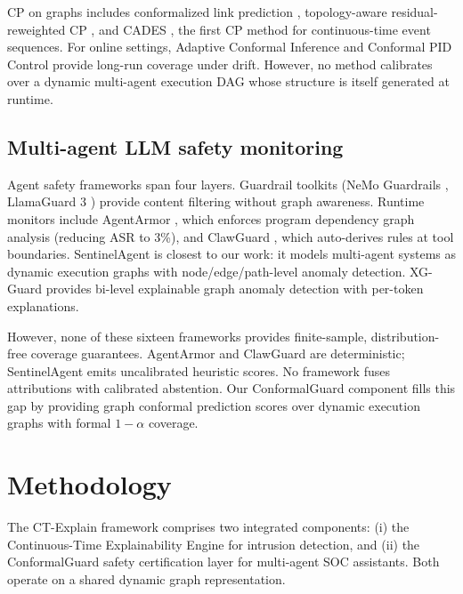 \documentclass[preprint,review,12pt]{elsarticle}
\begin{document}
CP on graphs includes conformalized link prediction \cite{conformalized_link_2024}, topology-aware residual-reweighted CP \cite{residual_reweighted_cp_2025}, and CADES \cite{cades_2025}, the first CP method for continuous-time event sequences. For online settings, Adaptive Conformal Inference \cite{gibbs_aci_2024} and Conformal PID Control \cite{angelopoulos_pid_2024} provide long-run coverage under drift. However, no method calibrates over a dynamic multi-agent execution DAG whose structure is itself generated at runtime.

\subsection{Multi-agent LLM safety monitoring}

Agent safety frameworks span four layers. Guardrail toolkits (NeMo Guardrails \cite{nemo_guardrails_2023}, LlamaGuard 3 \cite{llamaguard3_2024}) provide content filtering without graph awareness. Runtime monitors include AgentArmor \cite{agentarmor_2025}, which enforces program dependency graph analysis (reducing ASR to 3\%), and ClawGuard \cite{clawguard_2025}, which auto-derives rules at tool boundaries. SentinelAgent \cite{sentinelagent_2025} is closest to our work: it models multi-agent systems as dynamic execution graphs with node/edge/path-level anomaly detection. XG-Guard \cite{xgguard_2025} provides bi-level explainable graph anomaly detection with per-token explanations.

However, none of these sixteen frameworks provides finite-sample, distribution-free coverage guarantees. AgentArmor and ClawGuard are deterministic; SentinelAgent emits uncalibrated heuristic scores. No framework fuses attributions with calibrated abstention. Our ConformalGuard component fills this gap by providing graph conformal prediction scores over dynamic execution graphs with formal $1-\alpha$ coverage.


\section{Methodology}
\label{sec:methodology}

The CT-Explain framework comprises two integrated components: (i) the Continuous-Time Explainability Engine for intrusion detection, and (ii) the ConformalGuard safety certification layer for multi-agent SOC assistants. Both operate on a shared dynamic graph representation.
\end{document}
